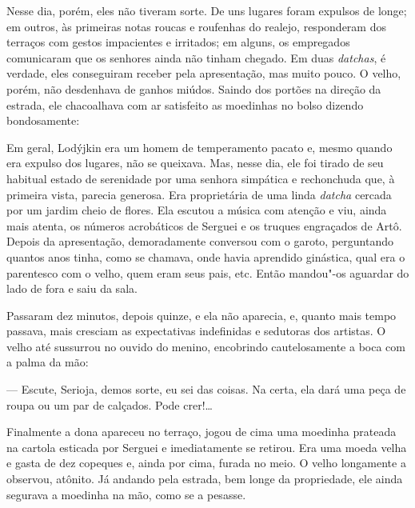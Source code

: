 Nesse dia, porém, eles não tiveram sorte. De uns lugares foram expulsos
de longe; em outros, às primeiras notas roucas e roufenhas do realejo,
responderam dos terraços com gestos impacientes e irritados; em alguns,
os empregados comunicaram que os senhores ainda não tinham chegado. Em
duas \emph{datchas}, é verdade, eles conseguiram receber pela
apresentação, mas muito pouco. O velho, porém, não desdenhava de ganhos
miúdos. Saindo dos portões na direção da estrada, ele chacoalhava com ar satisfeito as moedinhas no bolso dizendo bondosamente:


Em geral, Lodýjkin era um homem de temperamento pacato e, mesmo quando
era expulso dos lugares, não se queixava. Mas, nesse dia, ele foi tirado
de seu habitual estado de serenidade por uma senhora simpática e
rechonchuda que, à primeira vista, parecia generosa. Era proprietária de
uma linda \emph{datcha} cercada por um jardim cheio de flores. Ela
escutou a música com atenção e viu, ainda mais atenta, os números
acrobáticos de Serguei e os truques engraçados de Artô. Depois da
apresentação, demoradamente conversou com o garoto, perguntando quantos
anos tinha, como se chamava, onde havia aprendido ginástica, qual era o
parentesco com o velho, quem eram seus pais, etc. Então mandou"-os
aguardar do lado de fora e saiu da sala.

Passaram dez minutos, depois quinze, e ela não aparecia, e, quanto mais
tempo passava, mais cresciam as expectativas indefinidas e sedutoras dos
artistas. O velho até sussurrou no ouvido do menino, encobrindo
cautelosamente a boca com a palma da mão:

--- Escute, Serioja, demos sorte, eu sei das coisas. Na certa, ela dará
uma peça de roupa ou um par de calçados. Pode crer!\ldots{}

Finalmente a dona apareceu no terraço, jogou de cima uma moedinha
prateada na cartola esticada por Serguei e imediatamente se retirou. Era
uma moeda velha e gasta de dez copeques e, ainda por cima, furada no
meio. O velho longamente a observou, atônito. Já andando pela estrada,
bem longe da propriedade, ele ainda segurava a moedinha na mão, como se
a pesasse.

